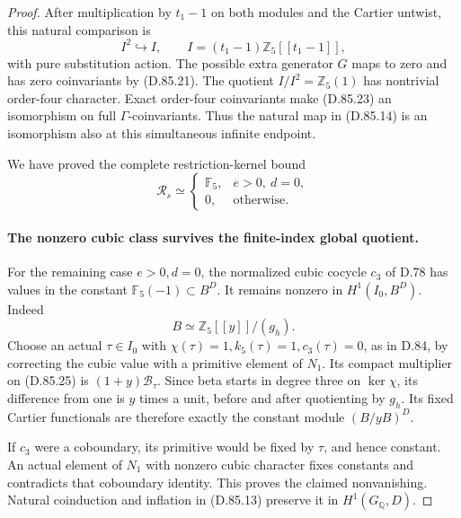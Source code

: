 \begin{proof}
After multiplication by \(t_1-1\) on both modules and
the Cartier untwist, this natural comparison is
\[
 I^2\hookrightarrow I,\qquad
 I=(t_1-1)\mathbb Z_5[[t_1-1]],
                                                               \tag{D.85.23}
\]
with pure substitution action. The possible extra generator
\(G\) maps to zero and has zero coinvariants by (D.85.21).
The quotient \(I/I^2=\mathbb Z_5(1)\) has nontrivial
order-four character. Exact order-four coinvariants make
(D.85.23) an isomorphism on full \(\Gamma\)-coinvariants.
Thus the natural map in (D.85.14) is an isomorphism also
at this simultaneous infinite endpoint.

We have proved the complete restriction-kernel bound
\[
 \mathcal R_s\simeq
 \begin{cases}
 \mathbb F_5,&e>0,\ d=0,\\
 0,&\text{otherwise}.
 \end{cases}                                                    \tag{D.85.24}
\]

\paragraph{The nonzero cubic class survives the finite-index global quotient.}
For the remaining case \(e>0,d=0\), the normalized cubic
cocycle \(c_3\) of D.78 has values in the constant
\(\mathbb F_5(-1)\subset B^D\). It remains nonzero in
\(H^1(I_0,B^D)\). Indeed
\[
                    B\simeq\mathbb Z_5[[y]]/(g_h).
                                                               \tag{D.85.25}
\]
Choose an actual \(\tau\in I_0\) with
\(\chi(\tau)=1,k_5(\tau)=1,c_3(\tau)=0\), as in D.84,
by correcting the cubic value with a primitive element of
\(N_1\). Its compact multiplier on (D.85.25) is
\((1+y)\mathcal B_\tau\). Since beta starts in degree
three on \(\ker\chi\), its difference from one is
\(y\) times a unit, before and after quotienting by \(g_h\).
Its fixed Cartier functionals are therefore exactly the
constant module \((B/yB)^D\).

If \(c_3\) were a coboundary, its primitive would be fixed
by \(\tau\), and hence constant. An actual element of
\(N_1\) with nonzero cubic character fixes constants and
contradicts that coboundary identity. This proves the claimed
nonvanishing. Natural coinduction and inflation in (D.85.13)
preserve it in \(H^1(G_{\mathbb Q},D)\).


\end{proof}
